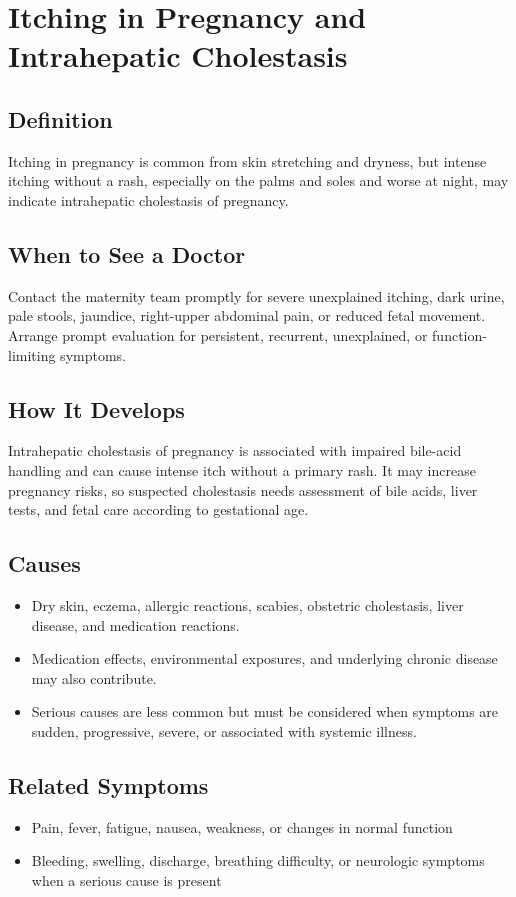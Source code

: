 \chapter{Itching in Pregnancy and Intrahepatic Cholestasis}

\section*{Definition}
Itching in pregnancy is common from skin stretching and dryness, but intense itching without a rash, especially on the palms and soles and worse at night, may indicate intrahepatic cholestasis of pregnancy.

\section*{When to See a Doctor}
Contact the maternity team promptly for severe unexplained itching, dark urine, pale stools, jaundice, right-upper abdominal pain, or reduced fetal movement. Arrange prompt evaluation for persistent, recurrent, unexplained, or function-limiting symptoms.

\section*{How It Develops}
Intrahepatic cholestasis of pregnancy is associated with impaired bile-acid handling and can cause intense itch without a primary rash. It may increase pregnancy risks, so suspected cholestasis needs assessment of bile acids, liver tests, and fetal care according to gestational age.

\section*{Causes}
\begin{itemize}
  \item Dry skin, eczema, allergic reactions, scabies, obstetric cholestasis, liver disease, and medication reactions.
  \item Medication effects, environmental exposures, and underlying chronic disease may also contribute.
  \item Serious causes are less common but must be considered when symptoms are sudden, progressive, severe, or associated with systemic illness.
\end{itemize}

\section*{Related Symptoms}
\begin{itemize}
  \item Pain, fever, fatigue, nausea, weakness, or changes in normal function
  \item Bleeding, swelling, discharge, breathing difficulty, or neurologic symptoms when a serious cause is present
\end{itemize}

